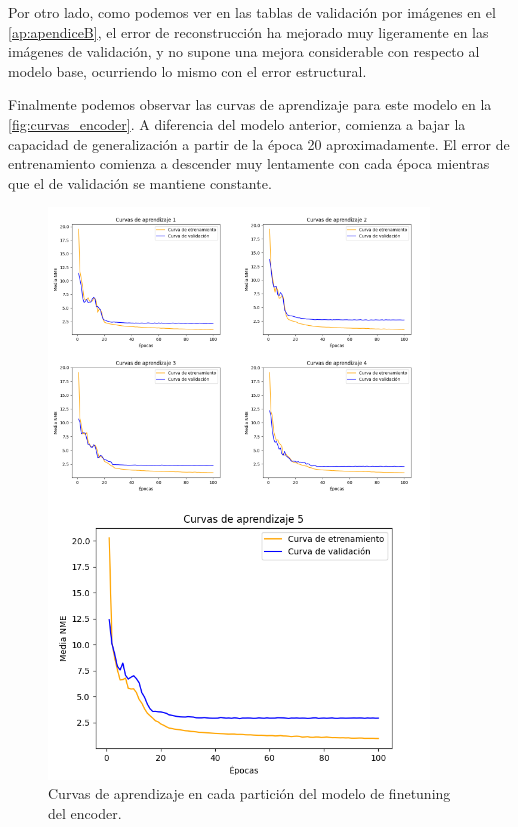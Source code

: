     \medskip
    
    \noindent Por otro lado, como podemos ver en las tablas de validación por imágenes en el \autoref{ap:apendiceB}, el error de reconstrucción ha mejorado muy ligeramente en las imágenes de validación, y no supone una mejora considerable con respecto al modelo base, ocurriendo lo mismo con el error estructural.

    \medskip

    \noindent Finalmente podemos observar las curvas de aprendizaje para este modelo en la \autoref{fig:curvas_encoder}. A diferencia del modelo anterior, comienza a bajar la capacidad de generalización a partir de la época 20 aproximadamente. El error de entrenamiento comienza a descender muy lentamente con cada época mientras que el de validación se mantiene constante.

    \begin{figure}[H]
        \centering
        \includegraphics[width=0.9\textwidth]{img/curvas_encoder.png}
        \caption{Curvas de aprendizaje en cada partición del modelo de finetuning del encoder.}
        \label{fig:curvas_encoder}
    \end{figure}


